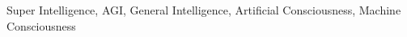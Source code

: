 \documentclass[conference]{IEEEtran}
\begin{document}
\begin{IEEEkeywords}
Super Intelligence, AGI, General Intelligence, Artificial Consciousness, Machine Consciousness
\end{IEEEkeywords}















\vspace{12pt}
\color{red}
\end{document}
